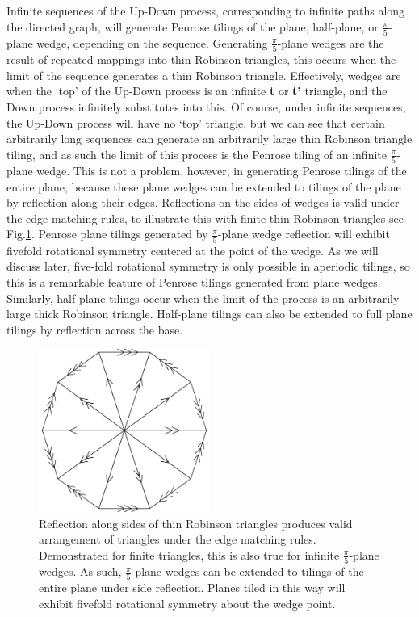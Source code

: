 \documentclass[
  oneside,
  11pt, a4paper,
  footinclude=true,
  headinclude=true,
  cleardoublepage=empty
]{scrbook}
\begin{document}
Infinite sequences of the Up-Down process, corresponding to infinite paths along the directed graph, will generate Penrose tilings of the plane, half-plane, or $\frac{\pi}{5}$-plane wedge, depending on the sequence. Generating $\frac{\pi}{5}$-plane wedges are the result of repeated mappings into thin Robinson triangles, this occurs when the limit of the sequence generates a thin Robinson triangle. Effectively, wedges are when the `top' of the Up-Down process is an infinite \textbf{t} or \textbf{t'} triangle, and the Down process infinitely substitutes into this. Of course, under infinite sequences, the Up-Down process will have no `top' triangle, but we can see that certain arbitrarily long sequences can generate an arbitrarily large thin Robinson triangle tiling, and as such the limit of this process is the Penrose tiling of an infinite $\frac{\pi}{5}$-plane wedge. This is not a problem, however, in generating Penrose tilings of the entire plane, because these plane wedges can be extended to tilings of the plane by reflection along their edges. Reflections on the sides of wedges is valid under the edge matching rules, to illustrate this with finite thin Robinson triangles see Fig.\ref{fig:WedgeWheel}.  Penrose plane tilings generated by $\frac{\pi}{5}$-plane wedge reflection will exhibit fivefold rotational symmetry centered at the point of the wedge. As we will discuss later, five-fold rotational symmetry is only possible in aperiodic tilings, so this is a remarkable feature of Penrose tilings generated from plane wedges. Similarly, half-plane tilings occur when the limit of the process is an arbitrarily large thick Robinson triangle. Half-plane tilings can also be extended to full plane tilings by reflection across the base.

\begin{figure}
\centering
\includegraphics[width=0.5\textwidth]{WedgeWheel}
\caption[Reflection along $\frac{\pi}{5}$-plane Wedge Edges]{Reflection along sides of thin Robinson triangles produces valid arrangement of triangles under the edge matching rules. Demonstrated for finite triangles, this is also true for infinite  $\frac{\pi}{5}$-plane wedges. As such,  $\frac{\pi}{5}$-plane wedges can be extended to tilings of the entire plane under side reflection. Planes tiled in this way will exhibit fivefold rotational symmetry about the wedge point.}
\label{fig:WedgeWheel}
\end{figure}
\end{document}
